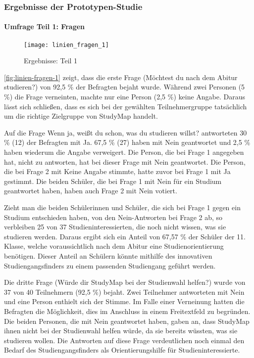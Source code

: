 \subsubsection{Ergebnisse der Prototypen-Studie}

\paragraph{Umfrage Teil 1: Fragen}

\begin{figure}[H]
    \centering
    \texttt{[image: linien\_fragen\_1]}
    \caption{Ergebnisse: Teil 1}
    \label{fig:linien-fragen-1}
\end{figure}

\autoref{fig:linien-fragen-1} zeigt, dass die erste Frage (\glqq Möchtest du nach dem Abitur studieren?\grqq{}) von 92,5 \% der Befragten bejaht wurde. Während zwei Personen (5 \%) die Frage verneinten, machte nur eine Person (2,5 \%) keine Angabe. Daraus lässt sich schließen, dass es sich bei der gewählten Teilnehmergruppe tatsächlich um die richtige Zielgruppe von StudyMap handelt.

Auf die Frage \glqq Wenn ja, weißt du schon, was du studieren willst?\grqq{} antworteten 30 \% (12) der Befragten mit \glqq Ja\grqq{}. 67,5 \% (27) haben mit \glqq Nein\grqq{} geantwortet und 2,5 \% haben wiederum die Angabe verweigert. Die Person, die bei Frage 1 angegeben hat, nicht zu antworten, hat bei dieser Frage mit \glqq Nein\grqq{} geantwortet. Die Person, die bei Frage 2 mit \glqq Keine Angabe\grqq{} stimmte, hatte zuvor bei Frage 1 mit \glqq Ja\grqq{} gestimmt. Die beiden Schüler, die bei Frage 1 mit \glqq Nein\grqq{} für ein Studium geantwortet haben, haben auch Frage 2 mit \glqq Nein\grqq{} votiert.

Zieht man die beiden Schülerinnen und Schüler, die sich bei Frage 1 gegen ein Studium entschieden haben, von den \glqq Nein\grqq{}-Antworten bei Frage 2 ab, so verbleiben 25 von 37 Studieninteressierten, die noch nicht wissen, was sie studieren werden. Daraus ergibt sich ein Anteil von 67,57 \% der Schüler der 11. Klasse, welche voraussichtlich nach dem Abitur eine Studienorientierung benötigen. Dieser Anteil an Schülern könnte mithilfe des innovativen Studiengangsfinders zu einem passenden Studiengang geführt werden.

Die dritte Frage (\glqq Würde dir StudyMap bei der Studienwahl helfen?\grqq{}) wurde von 37 von 40 Teilnehmern (92,5 \%) bejaht. Zwei Teilnehmer antworteten mit \glqq Nein\grqq{} und eine Person enthielt sich der Stimme. Im Falle einer Verneinung hatten die Befragten die Möglichkeit, dies im Anschluss in einem Freitextfeld zu begründen. Die beiden Personen, die mit \glqq Nein\grqq{} geantwortet haben, gaben an, dass StudyMap ihnen nicht bei der Studienwahl helfen würde, da sie bereits wüssten, was sie studieren wollen. Die Antworten auf diese Frage verdeutlichen noch einmal den Bedarf des Studiengangsfinders als Orientierungshilfe für Studieninteressierte.

